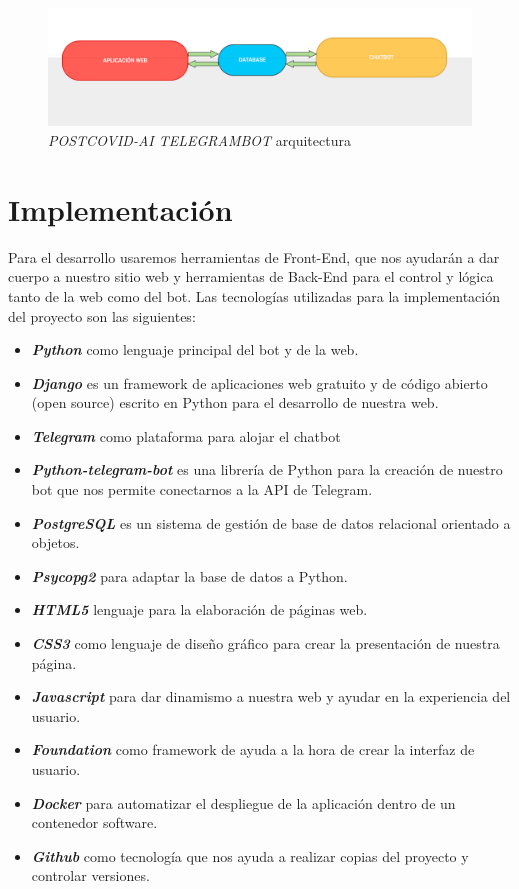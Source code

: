 \begin{figure}[h]
    \centering
    \includegraphics[width=1\textwidth]{imagenes/arquitecture.png}
    \caption{\textit{POSTCOVID-AI TELEGRAMBOT} arquitectura}
    \label{fig:arquitectura}
\end{figure}

\section{Implementación}
Para el desarrollo usaremos herramientas de Front-End, que nos ayudarán a dar cuerpo a nuestro sitio web y herramientas de Back-End para el control y lógica tanto de la web como del bot. Las tecnologías utilizadas para la implementación del proyecto son las siguientes:

\begin{itemize}
\item \textit{\textbf{Python}} como lenguaje principal del bot y de la web.
\item \textit{\textbf{Django}} es un framework de aplicaciones web gratuito y de código abierto (open source) escrito en Python para el desarrollo de nuestra web.
\item \textit{\textbf{Telegram}} como plataforma para alojar el chatbot
\item \textit{\textbf{Python-telegram-bot}} es una librería de Python para la creación de nuestro bot que nos permite conectarnos a la API de Telegram.
\item \textit{\textbf{PostgreSQL}} es un sistema de gestión de base de datos relacional orientado a objetos.
\item \textit{\textbf{Psycopg2}} para adaptar la base de datos a Python.
\item \textit{\textbf{HTML5}} lenguaje para la elaboración de páginas web.
\item \textit{\textbf{CSS3}} como lenguaje de diseño gráfico para crear la presentación de nuestra página.
\item \textit{\textbf{Javascript}} para dar dinamismo a nuestra web y ayudar en la experiencia del usuario.
\item \textit{\textbf{Foundation}} como framework de ayuda a la hora de crear la interfaz de usuario.
\item \textit{\textbf{Docker}} para automatizar el despliegue de la aplicación dentro de un contenedor software.
\item \textit{\textbf{Github}} como tecnología que nos ayuda a realizar copias del proyecto y controlar versiones.
\end{itemize}


